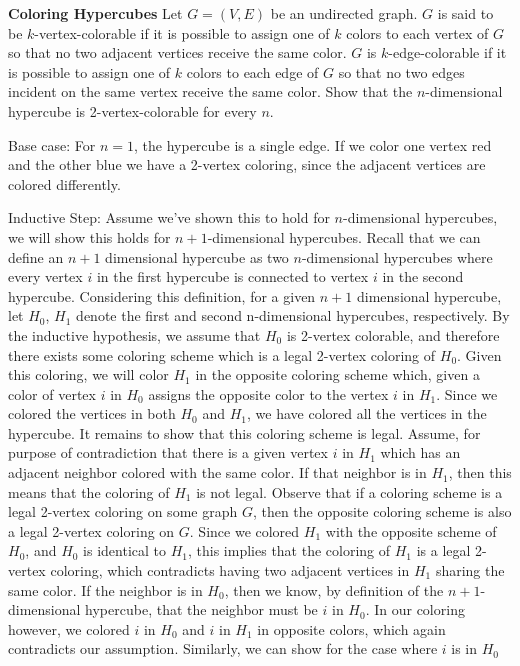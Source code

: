 \question \textbf{Coloring Hypercubes} \newline Let $G = (V, E)$ be 
an undirected graph. $G$ is said to be $k$-vertex-colorable if it is 
possible to assign one of $k$ colors to each vertex of $G$ so that no 
two adjacent vertices receive the same color. $G$ is $k$-edge-colorable 
if it is possible to assign one of $k$ colors to each edge of $G$ so 
that no two edges incident on the same vertex receive the same color. \newline
Show that the $n$-dimensional hypercube is 2-vertex-colorable for 
every $n$.
\begin{solution}[3in]
Base case: For $n = 1$, the hypercube is a single edge. If we color 
one vertex red and the other blue we have a 2-vertex coloring, since 
the adjacent vertices are colored differently. 

Inductive Step: Assume we’ve shown this to hold for $n$-dimensional 
hypercubes, we will show this holds for $n + 1$-dimensional hypercubes. 
Recall that we can define an $n + 1$ dimensional hypercube as two 
$n$-dimensional hypercubes where every vertex $i$ in the first 
hypercube is connected to vertex $i$ in the second hypercube. 
Considering this definition, for a given $n + 1$ dimensional 
hypercube, let $H_0$, $H_1$ denote the first and second n-dimensional 
hypercubes, respectively. By the inductive hypothesis, we assume that 
$H_0$ is 2-vertex colorable, and therefore there exists some coloring 
scheme which is a legal 2-vertex coloring of $H_0$. Given this coloring, 
we will color $H_1$ in the opposite coloring scheme which, given a color 
of vertex $ i$ in $H_0$ assigns the opposite color to the vertex $i$ in 
$H_1$. Since we colored the vertices in both $H_0$ and $H_1$, we have 
colored all the vertices in the hypercube. It remains to show that this coloring scheme is legal. Assume, for purpose of contradiction that there is a given 
vertex $i$ in $H_1$ which has an adjacent neighbor colored with the 
same color. If that neighbor is in $H_1$, then this means that the 
coloring of $H_1$ is not legal. Observe that if a coloring scheme is 
a legal 2-vertex coloring on some graph $G$, then the opposite 
coloring scheme is also a legal 2-vertex coloring on $G$. Since we 
colored $H_1$ with the opposite scheme of $H_0$, and $H_0$ is identical 
to $H_1$, this implies that the coloring of $H_1$ is a legal 2-vertex 
coloring, which contradicts having two adjacent vertices in $H_1$ 
sharing the same color. If the neighbor is in $H_0$, then we know, 
by definition of the $n + 1$-dimensional hypercube, that the neighbor 
must be $i$ in $H_0$. In our coloring however, we colored $i$ in $H_0$ 
and $i$ in $H_1$ in opposite colors, which again contradicts our 
assumption. Similarly, we can show for the case where $i$ is in $H_0$
\end{solution}
